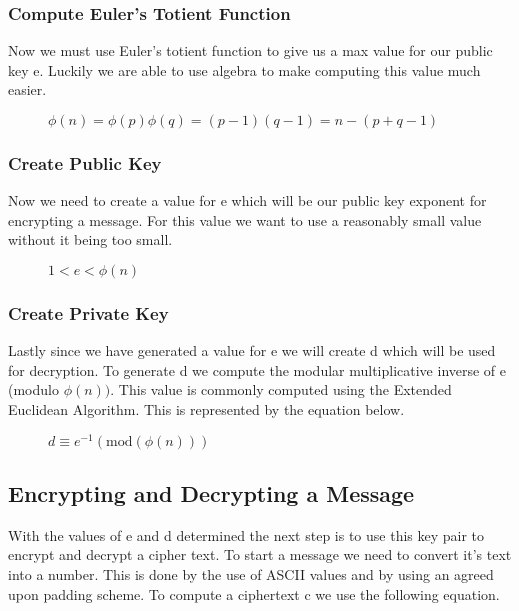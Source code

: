 \documentclass[conference]{IEEEtran}
\begin{document}
\subsubsection{Compute Euler's Totient Function}
Now we must use Euler's totient function to give us a max value for our public key e.
Luckily we are able to use algebra to make computing this value much easier.
\begin{figure}[h]
	\begin{center}
		$\phi \left(n\right)=\phi \left(p\right)\phi \left(q\right)=\left(p-1\right)\left(q-1\right)=n-\left(p+q-1\right)$
	\end{center}
\end{figure}

\subsubsection{Create Public Key}
Now we need to create a value for e which will be our public key exponent for encrypting a message. For this value we want to use a reasonably small value without it being too small. 
\begin{figure}[h]
	\begin{center}
		$1 < e < \phi \left(n\right)$
	\end{center}
\end{figure}
\subsubsection{Create Private Key}
Lastly since we have generated a value for e we will create d which will be used for decryption. To generate d we compute the modular multiplicative inverse of e (modulo $ \phi \left(n\right))$. This value is commonly computed using the Extended Euclidean Algorithm. This is represented by the equation below.
\begin{figure}[h]
	\begin{center}
		$d\equiv {e}^{-1}\left(\mathrm{mod}\left(\phi \left(n\right)\right)\right)$
	\end{center}
\end{figure}



\subsection{Encrypting and Decrypting a Message}

With the values of e and d determined the next step is to use this key pair to encrypt and decrypt a cipher text. To start a message we need to convert it's text into a number. This is done by the use of ASCII values and by using an agreed upon padding scheme. To compute a ciphertext c we use the following equation.
\end{document}
